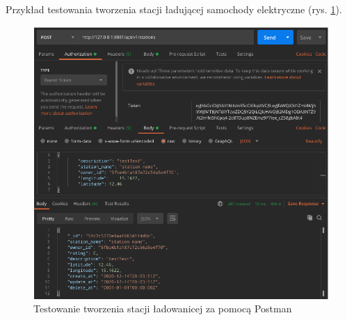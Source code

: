 Przykład testowania tworzenia stacji ładującej samochody elektryczne (rys. \ref{fig:postman_create_station}).
\begin{figure}[ht]
    \centering
        \includegraphics[width=0.9\linewidth]{rys04/postman_station_create.png}
        \caption{Testowanie tworzenia stacji ładowanicej za pomocą Postman}
    \label{fig:postman_create_station}
\end{figure}

